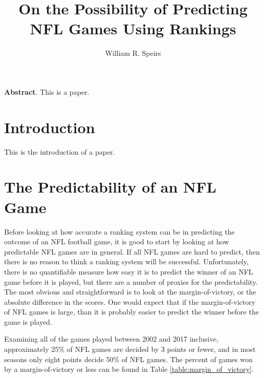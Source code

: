 \documentclass[11pt]{article}
\title{On the Possibility of Predicting NFL Games Using Rankings}
\author{William R. Speirs}
\date{} %
\begin{document}
\maketitle

\small
\textbf{Abstract}. This is a paper.\\
\normalsize


\section{Introduction}

This is the introduction of a paper.

\section{The Predictability of an NFL Game}

Before looking at how accurate a ranking system can be in predicting the outcome of an NFL football game, it is good to start by looking at how predictable NFL games are in general. If all NFL games are hard to predict, then there is no reason to think a ranking system will be successful. Unfortunately, there is no quantifiable measure how easy it is to predict the winner of an NFL game before it is played, but there are a number of proxies for the predictability. The most obvious and straightforward is to look at the margin-of-victory, or the absolute difference in the scores. One would expect that if the margin-of-victory of NFL games is large, than it is probably easier to predict the winner before the game is played.

Examining all of the games played between 2002 and 2017 inclusive, approximately 25\% of NFL games are decided by 3 points or fewer, and in most seasons only eight points decide 50\% of NFL games. The percent of games won by a margin-of-victory or less can be found in Table \ref{table:margin_of_victory}.
\end{document}
